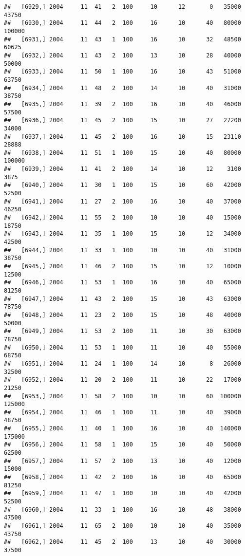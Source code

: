 \documentclass{article}\usepackage[]{graphicx}\usepackage[]{color}
\makeatletter
\newenvironment{kframe}{%
 \def\at@end@of@kframe{}%
 \ifinner\ifhmode%
  \def\at@end@of@kframe{\end{minipage}}%
  \begin{minipage}{\columnwidth}%
 \fi\fi%
 \def\FrameCommand##1{\hskip\@totalleftmargin \hskip-\fboxsep
 \colorbox{shadecolor}{##1}\hskip-\fboxsep
     \hskip-\linewidth \hskip-\@totalleftmargin \hskip\columnwidth}%
 \MakeFramed {\advance\hsize-\width
   \@totalleftmargin\z@ \linewidth\hsize
   \@setminipage}}%
 {\par\unskip\endMakeFramed%
 \at@end@of@kframe}
\newenvironment{knitrout}{}{} %
\makeatother
\begin{document}
\begin{knitrout}
\begin{kframe}
\begin{verbatim}
##   [6929,] 2004     11  41   2  100     10      12       0   35000   43750
##   [6930,] 2004     11  44   2  100     16      10      40   80000  100000
##   [6931,] 2004     11  43   1  100     16      10      32   48500   60625
##   [6932,] 2004     11  43   2  100     13      10      28   40000   50000
##   [6933,] 2004     11  50   1  100     16      10      43   51000   63750
##   [6934,] 2004     11  48   2  100     14      10      40   31000   38750
##   [6935,] 2004     11  39   2  100     16      10      40   46000   57500
##   [6936,] 2004     11  45   2  100     15      10      27   27200   34000
##   [6937,] 2004     11  45   2  100     16      10      15   23110   28888
##   [6938,] 2004     11  51   1  100     15      10      40   80000  100000
##   [6939,] 2004     11  41   2  100     14      10      12    3100    3875
##   [6940,] 2004     11  30   1  100     15      10      60   42000   52500
##   [6941,] 2004     11  27   2  100     16      10      40   37000   46250
##   [6942,] 2004     11  55   2  100     10      10      40   15000   18750
##   [6943,] 2004     11  35   1  100     15      10      12   34000   42500
##   [6944,] 2004     11  33   1  100     10      10      40   31000   38750
##   [6945,] 2004     11  46   2  100     15      10      12   10000   12500
##   [6946,] 2004     11  53   1  100     16      10      40   65000   81250
##   [6947,] 2004     11  43   2  100     15      10      43   63000   78750
##   [6948,] 2004     11  23   2  100     15      10      48   40000   50000
##   [6949,] 2004     11  53   2  100     11      10      30   63000   78750
##   [6950,] 2004     11  53   1  100     11      10      40   55000   68750
##   [6951,] 2004     11  24   1  100     14      10       8   26000   32500
##   [6952,] 2004     11  20   2  100     11      10      22   17000   21250
##   [6953,] 2004     11  58   2  100     10      10      60  100000  125000
##   [6954,] 2004     11  46   1  100     11      10      40   39000   48750
##   [6955,] 2004     11  40   1  100     16      10      40  140000  175000
##   [6956,] 2004     11  58   1  100     15      10      40   50000   62500
##   [6957,] 2004     11  57   2  100     13      10      40   12000   15000
##   [6958,] 2004     11  42   2  100     16      10      40   65000   81250
##   [6959,] 2004     11  47   1  100     10      10      40   42000   52500
##   [6960,] 2004     11  33   1  100     16      10      48   38000   47500
##   [6961,] 2004     11  65   2  100     10      10      40   35000   43750
##   [6962,] 2004     11  45   2  100     13      10      40   30000   37500

\end{verbatim}
\end{kframe}
\end{knitrout}
\end{document}
